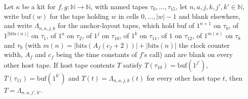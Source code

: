 \begin{theorem}
\label{Turing.NTimeDiag.qy_layT_pair}
\leanok
{}
Let $\kappa$ be a kit for $f, g : \mathbb{N} \to \mathbb{N}$, with named tapes $\tau_0, \dots,
\tau_{15}$, let $n, a, j, k, j', k' \in \mathbb{N}$, write $\mathrm{buf}(w)$ for the tape holding
$w$ in cells $0, \dots, |w| - 1$ and blank elsewhere, and write $\Lambda_{n,a,j,k}$ for the
anchor-layout tapes, which hold $\mathrm{buf}$ of $1^{n+1}$ on $\tau_0$, of
$1^{|\mathrm{bits}(n)|}$ on $\tau_1$, of $1^a$ on $\tau_2$, of $1^j$ on $\tau_{10}$, of $1^k$ on
$\tau_{11}$, of $1$ on $\tau_{12}$, of $1^{m(n)}$ on $\tau_8$ and $\tau_9$ (with $m(n) =
|\mathrm{bits}(A_f(c_f + 2))| + |\mathrm{bits}(n)|$ the clock counter width, $A_f$ and $c_f$ being
the time constants of $f$'s call) and are blank on every other host tape. If host tape contents $T$
satisfy $T(\tau_{10}) = \mathrm{buf}(1^{j'})$, $T(\tau_{11}) = \mathrm{buf}(1^{k'})$ and $T(t) =
\Lambda_{n,a,j,k}(t)$ for every other host tape $t$, then $T = \Lambda_{n,a,j',k'}$.
\end{theorem}

